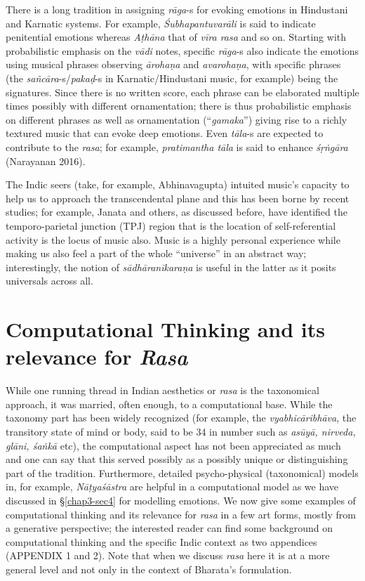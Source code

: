 There is a long tradition in assigning \textsl{rāga}-s for evoking emotions in Hindustani and Karnatic systems. For example, \textsl{Śubhapantuvarāli} is said to indicate penitential emotions whereas \textsl{Aṭhāna} that of \textsl{vīra rasa} and so on. Starting with probabilistic emphasis on the \textsl{vādi} notes, specific \textsl{rāga}-s also indicate the emotions using musical phrases observing \textsl{ārohaṇa} and \textsl{avarohaṇa}, with specific phrases (the \textsl{sañcāra}-s/\textsl{pakaḍ}-s in Karnatic/Hindustani music, for example) being the signatures. Since there is no written score, each phrase can be elaborated multiple times possibly with different ornamentation; there is thus probabilistic emphasis on different phrases as well as ornamentation (“\textsl{gamaka}”) giving rise to a richly textured music that can evoke deep emotions. Even \textsl{tāla}-s are expected to contribute to the \textsl{rasa}; for example, \textsl{pratimantha tāla} is said to enhance \textsl{śṛṅgāra} (Narayanan 2016). 

The Indic seers (take, for example, Abhinavagupta) intuited music’s capacity to help us to approach the transcendental plane and this has been borne by recent studies; for example, Janata and others, as discussed before, have identified the temporo-parietal junction (TPJ) region that is the location of self-referential activity is the locus of music also. Music is a highly personal experience while making us also feel a part of the whole “universe” in an abstract way; interestingly, the notion of \textsl{sādhāranīkaraṇa} is useful in the latter as it posits universals across all.

\section{Computational Thinking and its relevance for \textsl{Rasa}}\label{chap3-sec5}

While one running thread in Indian aesthetics or \textsl{rasa} is the taxonomical approach, it was married, often enough, to a computational base. While the taxonomy part has been widely recognized (for example, the \textsl{vyabhicāribhāva}, the transitory state of mind or body, said to be 34 in number such as \textsl{asūyā, nirveda, glāni, śaṅkā} etc), the computational aspect has not been appreciated as much and one can say that this served possibly as a possibly unique or distinguishing part of the tradition. Furthermore, detailed psycho-physical (taxonomical) models in, for example, \textsl{Nāṭyaśāstra} are helpful in a computational model as we have discussed in \S\ref{chap3-sec4} for modelling emotions. We now give some examples of computational thinking and its relevance for \textsl{rasa} in a few art forms, mostly from a generative perspective; the interested reader can find some background on computational thinking and the specific Indic context as two appendices (APPENDIX 1 and 2). Note that when we discuss \textsl{rasa} here it is at a more general level and not only in the context of Bharata’s formulation.\\[-20pt]

